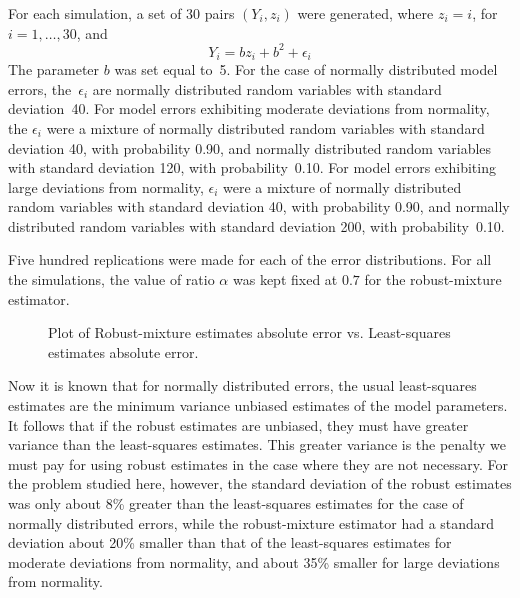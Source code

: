 \documentclass{admbmanual}
\begin{document}
For each simulation, a set of 30 pairs $(Y_i,z_i)$ were generated, where
$z_i=i$, \mbox{for $i=1,\ldots,30$}, and
\begin{equation*}
  Y_i=bz_i+b^2+\epsilon_i
\end{equation*}
The parameter $b$ was set equal to~5. For the case of normally distributed model
errors, the~$\epsilon_i$ are normally distributed random variables with standard
deviation~40. For model errors exhibiting moderate deviations from normality,
the $\epsilon_i$ were a mixture of normally distributed random variables with
standard deviation 40, with probability 0.90, and normally distributed random
variables with standard deviation 120, with probability~0.10. For model errors
exhibiting large deviations from normality, $\epsilon_i$ were a mixture of
normally distributed random variables with standard deviation 40, with
probability 0.90, and normally distributed random variables with standard
deviation 200, with probability~0.10.

Five hundred replications were made for each of the error distributions. For all
the simulations, the value of ratio $\alpha$ was kept fixed at $0.7$ for the
robust-mixture estimator.

\begin{figure}%
  \centering
  \vspace*{-.75\baselineskip}%
  { \par}%
  \caption{Plot of Robust-mixture estimates absolute error vs. Least-squares
    estimates absolute error.}%
  \label{fig:monte-carlo-03}
\end{figure}

Now it is known that for normally distributed errors, the usual least-squares
estimates are the minimum variance unbiased estimates of the model parameters.
It follows that if the robust estimates are unbiased, they must have greater
variance than the least-squares estimates. This greater variance is the penalty
we must pay for using robust estimates in the case where they are not necessary.
For the problem studied here, however, the standard deviation of the robust
estimates was only about 8\% greater than the least-squares estimates for the
case of normally distributed errors, while the robust-mixture estimator had a
standard deviation about 20\% smaller than that of the least-squares estimates
for moderate deviations from normality, and about 35\% smaller for large
deviations from normality.
\end{document}
